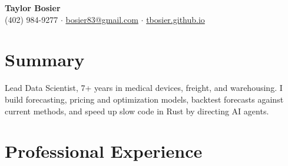 \documentclass[10pt]{article}
\begin{document}
\pagestyle{empty}

\begin{center}
    {\Huge \textbf{Taylor Bosier}}\\
    \vspace{0.3em}
    (402) 984-9277 \quad $\cdot$ \quad \href{mailto:bosier83@gmail.com}{bosier83@gmail.com} \quad $\cdot$ \quad \href{http://tbosier.github.io}{tbosier.github.io}
\end{center}

\section{Summary}
Lead Data Scientist, 7+ years in medical devices, freight, and warehousing. I build forecasting, pricing and optimization models, backtest forecasts against current methods, and speed up slow code in Rust by directing AI agents.
\section{Professional Experience}
\end{document}
